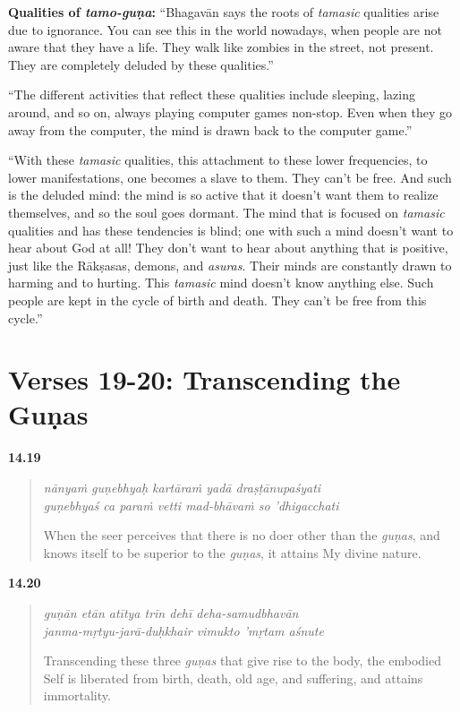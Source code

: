 \textbf{Qualities of \textit{tamo-guṇa}:} \enquote{Bhagavān says the roots of \textit{tamasic} qualities arise due to ignorance. You can see this in the world nowadays, when people are not aware that they have a life. They walk like zombies in the street, not present. They are completely deluded by these qualities.}

\enquote{The different activities that reflect these qualities include sleeping, lazing around, and so on, always playing computer games non-stop. Even when they go away from the computer, the mind is drawn back to the computer game.}

\enquote{With these \textit{tamasic} qualities, this attachment to these lower frequencies, to lower manifestations, one becomes a slave to them. They can’t be free. And such is the deluded mind: the mind is so active that it doesn’t want them to realize themselves, and so the soul goes dormant. The mind that is focused on \textit{tamasic} qualities and has these tendencies is blind; one with such a mind doesn’t want to hear about God at all! They don’t want to hear about anything that is positive, just like the Rākṣasas, demons, and \textit{asuras}. Their minds are constantly drawn to harming and to hurting. This \textit{tamasic} mind doesn’t know anything else. Such people are kept in the cycle of birth and death. They can’t be free from this cycle.}

\section{Verses 19-20: Transcending the Guṇas}\label{sec-verses-19-20-transcending-the-gunas}


\par\noindent\textbf{14.19}\par
\begin{verse}
\textit{nānyaṁ guṇebhyaḥ kartāraṁ yadā draṣṭānupaśyati} \\
\textit{guṇebhyaś ca paraṁ vetti mad-bhāvaṁ so ’dhigacchati}

\noindent When the seer perceives that there is no doer other than the \textit{guṇas}, and knows itself to be superior to the \textit{guṇas}, it attains My divine nature.
\end{verse}
\par



\par\noindent\textbf{14.20}\par
\begin{verse}
\textit{guṇān etān atītya trīn dehī deha-samudbhavān} \\
\textit{janma-mṛtyu-jarā-duḥkhair vimukto ’mṛtam aśnute}

\noindent Transcending these three \textit{guṇas} that give rise to the body, the embodied Self is liberated from birth, death, old age, and suffering, and attains immortality.
\end{verse}
\par


